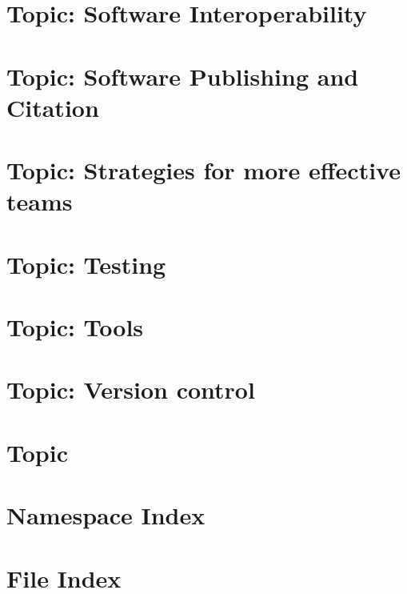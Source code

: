 \documentclass[twoside]{book}
\newcommand{\+}{\discretionary{\mbox{\scriptsize$\hookleftarrow$}}{}{}}
\begin{document}
\chapter{Topic\+: Software Interoperability}
\label{md_markdown_topic_software_interoperability}

\chapter{Topic\+: Software Publishing and Citation}
\label{md_markdown_topic_software_publishing_and_citation}

\chapter{Topic\+: Strategies for more effective teams}
\label{md_markdown_topic_stategies_for_more_effective_teams}

\chapter{Topic\+: Testing}
\label{md_markdown_topic_testing}

\chapter{Topic\+: Tools}
\label{md_markdown_topic_tools}

\chapter{Topic\+: Version control}
\label{md_markdown_topic_version_control}

\chapter{Topic}
\label{md_markdown_topics}

\chapter{Namespace Index}

\chapter{File Index}

\end{document}
